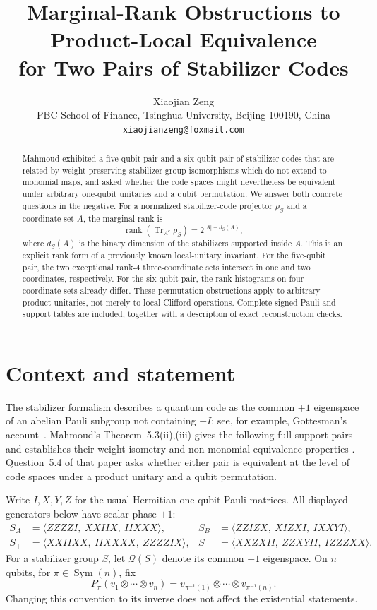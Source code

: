 \documentclass[11pt]{article}
\title{Marginal-Rank Obstructions to Product-Local Equivalence\\
for Two Pairs of Stabilizer Codes}
\author{Xiaojian Zeng\\
\small PBC School of Finance, Tsinghua University, Beijing 100190, China\\
\small \texttt{xiaojianzeng@foxmail.com}}
\date{}
\DeclareMathOperator{\rank}{rank}
\DeclareMathOperator{\Tr}{Tr}
\newcommand{\cQ}{\mathcal Q}
\begin{document}
\maketitle

\begin{abstract}
Mahmoud exhibited a five-qubit pair and a six-qubit pair of stabilizer
codes that are related by weight-preserving stabilizer-group isomorphisms
which do not extend to monomial maps, and asked whether the code spaces
might nevertheless be equivalent under arbitrary one-qubit unitaries and a
qubit permutation.  We answer both concrete questions in the negative.
For a normalized stabilizer-code projector $\rho_S$ and a coordinate set
$A$, the marginal rank is
\[
 \rank\!\left(\Tr_{A^c}\rho_S\right)=2^{|A|-d_S(A)},
\]
where $d_S(A)$ is the binary dimension of the stabilizers supported inside
$A$.  This is an explicit rank form of a previously known local-unitary
invariant.  For the five-qubit pair, the two exceptional rank-$4$
three-coordinate sets intersect in one and two coordinates, respectively.
For the six-qubit pair, the rank histograms on four-coordinate sets already
differ.  These permutation obstructions apply to arbitrary product
unitaries, not merely to local Clifford operations.  Complete signed Pauli
and support tables are included, together with a description of exact
reconstruction checks.
\end{abstract}

\section{Context and statement}

The stabilizer formalism describes a quantum code as the common $+1$
eigenspace of an abelian Pauli subgroup not containing $-I$; see, for
example, Gottesman's account~\cite{Gottesman1997}.  Mahmoud's
Theorem~5.3(ii),(iii) gives the following full-support pairs and establishes
their weight-isometry and non-monomial-equivalence properties
\cite{Mahmoud2026}.  Question~5.4 of that paper asks whether either pair is
equivalent at the level of code spaces under a product unitary and a qubit
permutation.

Write $I,X,Y,Z$ for the usual Hermitian one-qubit Pauli matrices.  All
displayed generators below have scalar phase $+1$:
\begin{align*}
 S_A&=\langle ZZZZI,\ XXIIX,\ IIXXX\rangle,&
 S_B&=\langle ZZIZX,\ XIZXI,\ IXXYI\rangle,\\
 S_+&=\langle XXIIXX,\ IIXXXX,\ ZZZZIX\rangle,&
 S_-&=\langle XXZXII,\ ZZXYII,\ IZZZXX\rangle.
\end{align*}
For a stabilizer group $S$, let $\cQ(S)$ denote its common $+1$
eigenspace.  On $n$ qubits, for $\pi\in\operatorname{Sym}(n)$, fix
\[
 P_\pi(v_1\otimes\cdots\otimes v_n)
 =v_{\pi^{-1}(1)}\otimes\cdots\otimes v_{\pi^{-1}(n)}.
\]
Changing this convention to its inverse does not affect the existential
statements.
\end{document}
